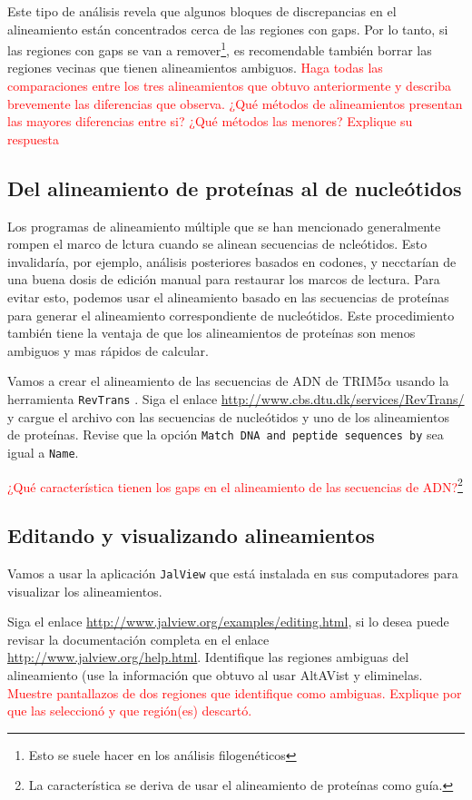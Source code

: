 \documentclass[letter,11pt]{book}
\begin{document}
Este tipo de análisis revela que algunos bloques de discrepancias en el alineamiento están concentrados cerca de las regiones con gaps. Por lo tanto, si las regiones con gaps se van a remover\footnote{Esto se suele hacer en los análisis filogenéticos}, es recomendable también borrar las regiones vecinas que tienen alineamientos ambiguos. \textcolor{red}{Haga todas las comparaciones entre los tres alineamientos que obtuvo anteriormente y describa brevemente las diferencias que observa. ¿Qué métodos de alineamientos presentan las mayores diferencias entre si? ¿Qué métodos las menores? Explique su respuesta}

\subsection{Del alineamiento de proteínas al de nucleótidos}

Los programas de alineamiento múltiple que se han mencionado generalmente rompen el marco de lctura cuando se alinean secuencias de ncleótidos. Esto invalidaría, por ejemplo, análisis posteriores  basados en codones, y necctarían de una buena dosis  de edición manual para restaurar los marcos de lectura. Para evitar esto, podemos usar el alineamiento basado en las secuencias de proteínas para generar el alineamiento correspondiente de nucleótidos. Este procedimiento también tiene la ventaja de que  los alineamientos de proteínas son menos ambiguos y mas rápidos de calcular.

Vamos a crear el alineamiento de las secuencias de ADN de TRIM5$\alpha$ usando la herramienta \Verb+RevTrans+ \citep{Wernersson2003}. Siga el enlace \url{http://www.cbs.dtu.dk/services/RevTrans/} y cargue el archivo con las secuencias de nucleótidos y uno de los alineamientos de proteínas. Revise que la opción \Verb+Match DNA and peptide sequences by+ sea igual a \Verb+Name+.

\textcolor{red}{¿Qué característica tienen los gaps en el alineamiento de las secuencias de ADN?\footnote{La característica se deriva de usar el alineamiento de proteínas como guía.}}

\subsection{Editando y visualizando alineamientos}

Vamos a usar la aplicación \Verb+JalView+ que está instalada en sus computadores para visualizar los alineamientos.

Siga el enlace \url{http://www.jalview.org/examples/editing.html}, si lo desea puede revisar la documentación completa en el enlace \url{http://www.jalview.org/help.html}. Identifique las regiones ambiguas del alineamiento (use la información que obtuvo al usar {\sc AltAVist} y eliminelas. \textcolor{red}{Muestre pantallazos de dos regiones que identifique como ambiguas. Explique por que las seleccionó y que región(es) descartó.}
\end{document}
